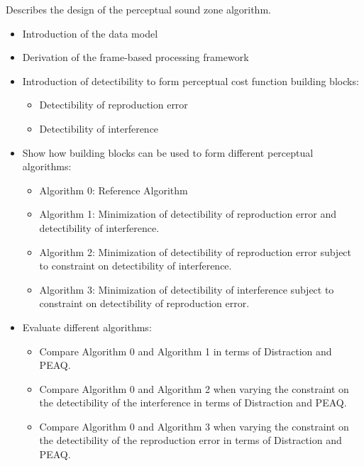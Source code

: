 Describes the design of the perceptual sound zone algorithm.
\begin{itemize}
    \item Introduction of the data model
    \item Derivation of the frame-based processing framework
    \item Introduction of detectibility to form perceptual cost function building blocks:
        \begin{itemize}
            \item Detectibility of reproduction error
            \item Detectibility of interference
        \end{itemize}
    \item Show how building blocks can be used to form different perceptual algorithms:
        \begin{itemize}
            \item Algorithm 0: Reference Algorithm
            \item Algorithm 1: Minimization of detectibility of reproduction error and detectibility of interference.
            \item Algorithm 2: Minimization of detectibility of reproduction error subject to constraint on detectibility of interference.
            \item Algorithm 3: Minimization of detectibility of interference subject to constraint on detectibility of reproduction error.
        \end{itemize}
    \item Evaluate different algorithms:
        \begin{itemize}
            \item Compare Algorithm 0 and Algorithm 1 in terms of Distraction and PEAQ.
            \item Compare Algorithm 0 and Algorithm 2 when varying the constraint on the detectibility of the interference in terms of Distraction and PEAQ.
            \item Compare Algorithm 0 and Algorithm 3 when varying the constraint on the detectibility of the reproduction error in terms of Distraction and PEAQ.
        \end{itemize}
\end{itemize}
